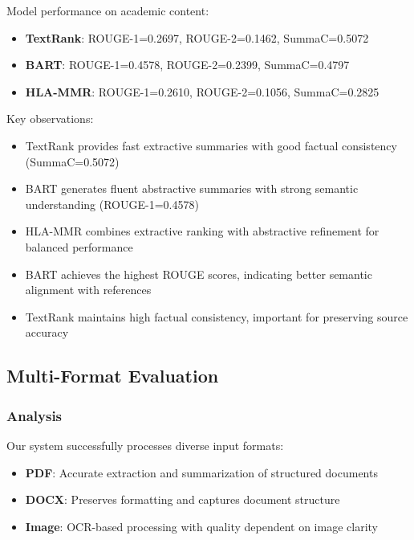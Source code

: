 Model performance on academic content:

\begin{itemize}
    \item \textbf{TextRank}: ROUGE-1=0.2697, ROUGE-2=0.1462, SummaC=0.5072
    \item \textbf{BART}: ROUGE-1=0.4578, ROUGE-2=0.2399, SummaC=0.4797
    \item \textbf{HLA-MMR}: ROUGE-1=0.2610, ROUGE-2=0.1056, SummaC=0.2825
\end{itemize}

Key observations:

\begin{itemize}
    \item TextRank provides fast extractive summaries with good factual consistency (SummaC=0.5072)
    \item BART generates fluent abstractive summaries with strong semantic understanding (ROUGE-1=0.4578)
    \item HLA-MMR combines extractive ranking with abstractive refinement for balanced performance
    \item BART achieves the highest ROUGE scores, indicating better semantic alignment with references
    \item TextRank maintains high factual consistency, important for preserving source accuracy
\end{itemize}

\subsection{Multi-Format Evaluation}



\subsubsection{Analysis}

Our system successfully processes diverse input formats:

\begin{itemize}
    \item \textbf{PDF}: Accurate extraction and summarization of structured documents
    \item \textbf{DOCX}: Preserves formatting and captures document structure
    \item \textbf{Image}: OCR-based processing with quality dependent on image clarity
\end{itemize}

